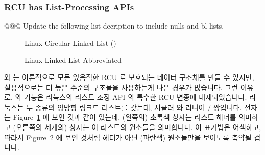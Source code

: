 \subsubsection{RCU has List-Processing APIs}
\label{sec:defer:RCU has List-Processing APIs}

@@@ Update the following list decription to include nulls and bl lists.

\begin{figure}[tb]
\centering
{}
\caption{Linux Circular Linked List ()}
\label{fig:defer:Linux Circular Linked List (list)}
\end{figure}

\begin{figure}[tb]
\centering
{}
\caption{Linux Linked List Abbreviated}
\label{fig:defer:Linux Linked List Abbreviated}
\end{figure}

 와  는 이론적으로 모든 있음직한
RCU 로 보호되는 데이터 구조체를 만들 수 있지만, 실용적으로는 더 높은 수준의
구조물을 사용하는게 나은 경우가 많습니다.
그런 이유로,  와  기능은
리눅스의 리스트 조정 API 의 특수한 RCU 변종에 내재되었습니다.
리눅스는 두 종류의 양방향 링크드 리스트를 갖는데, 서큘러 
와 리니어 / 쌍입니다.
전자는
Figure~\ref{fig:defer:Linux Circular Linked List (list)} 에 보인 것과 같이
있는데, (왼쪽의) 초록색 상자는 리스트 헤더를 의미하고 (오른쪽의 세개의) 상자는
이 리스트의 원소들을 의미합니다.
이 표기법은 어색하고, 따라서
Figure~\ref{fig:defer:Linux Linked List Abbreviated} 에 보인 것처럼 헤더가 아닌
(파란색) 원소들만을 보이도록 축약될 겁니다.
\iffalse

